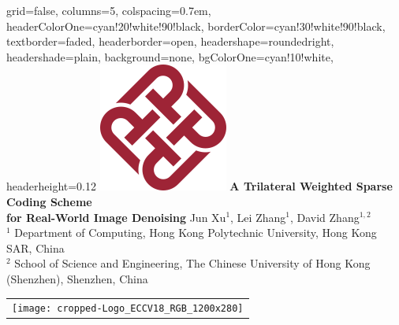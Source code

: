 \documentclass[landscape,fontscale=0.292,archE]{baposter}
\begin{document}
\begin{poster}{
 grid=false,
 columns=5,
 colspacing=0.7em,
 headerColorOne=cyan!20!white!90!black,
 borderColor=cyan!30!white!90!black,
 textborder=faded,
 headerborder=open,
 headershape=roundedright,
 headershade=plain,
 background=none,
 bgColorOne=cyan!10!white,
 headerheight=0.12\textheight}
 {
      \includegraphics[width=0.09\linewidth]{PolyU_logo.png}
      \makebox[0.01\textwidth]{} 
 }
 {\sc\Huge\bf A Trilateral Weighted Sparse Coding Scheme \\ for Real-World Image Denoising}
 {
 \vspace{0.1em} 
 \normalsize{Jun Xu$^1$, Lei Zhang$^1$, David Zhang$^{1,2}$ }
 \\[0.1em]
 {\normalsize
 $^1$ Department of Computing, Hong Kong Polytechnic University, Hong Kong SAR, China
 \\
 $^2$ School of Science and Engineering, The Chinese University of Hong Kong (Shenzhen), Shenzhen, China
 \\[0.1em] 
 }
 }
 {
    \begin{tabular}{r}
        \texttt{[image: cropped-Logo\_ECCV18\_RGB\_1200x280]}
    \end{tabular}
 }


\end{poster}
\end{document}
